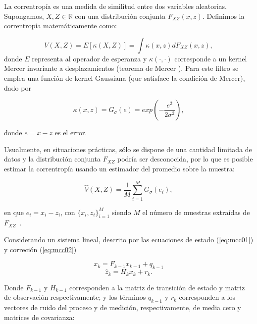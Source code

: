 La correntrop\'ia es una medida de similitud entre dos variables aleatorias. Supongamos, $X,Z \in \mathbb{R}$ con una distribuci\'on conjunta $F_{XZ} (x,z)$. Definimos la correntrop\'ia matem\'aticamente como:

\begin{equation}
V(X,Z) = E[\kappa(X,Z)] = \int \kappa(x,z) dF_{XZ} (x,z),
\label{eq:eqcorr}
\end{equation}
\noindent
donde $E$ representa al operador de esperanza y $\kappa(\cdot,\cdot)$ corresponde a un \gls{kernel} Mercer invariante a desplazamientos (teorema de Mercer \cite{mercer}). Para este filtro se emplea una funci\'on de kernel Gaussiana (que satisface la condici\'on de Mercer), dado por

\begin{equation}
\kappa(x, z) = G_{\sigma} (e) = exp \left(-\dfrac{e^2}{2\sigma^2} \right),
\label{eq:eqkappa}
\end{equation}

donde $e=x-z$ es el error.
\bigskip

Usualmente, en situaciones pr\'acticas, s\'olo se dispone de una cantidad limitada de datos y la distribuci\'on conjunta $F_{XZ}$ podr\'ia ser desconocida, por lo que es posible estimar la correntrop\'ia usando un estimador del promedio sobre la muestra:

\begin{equation}
\hat{V}(X,Z) = \dfrac{1}{M} \sum_{i=1}^M G_{\sigma} (e_i),
\label{eq:eqcoor_est}
\end{equation} 

en que $e_i = x_i - z_i$, con $\{x_i,z_i\}_{i=1}^M$ siendo $M$ el n\'umero de muestras extra\'idas de $F_{XZ}$~\cite{badong}.
\bigskip

Considerando un sistema lineal, descrito por las ecuaciones de estado (\ref{eq:mcc01}) y correci\'on (\ref{eq:mcc02}) 

\begin{equation}
x_{k} = F_{k-1}x_{k-1} + q_{k-1}
\label{eq:mcc01}
\end{equation}
\begin{equation}
\hat{z}_k = H_k x_{k} + r_k.
\label{eq:mcc02}
\end{equation}

Donde $F_{k-1}$ y $H_{k-1}$ corresponden a la matriz de transici\'on de estado y matriz de observaci\'on respectivamente; y los t\'erminos $q_{k-1}$ y $r_k$ corresponden a los vectores de ruido del proceso y de medici\'on, respectivamente, de media cero y matrices de covarianza:
\bigskip

